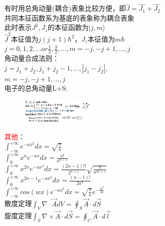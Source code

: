 \documentclass[a4paper,8pt]{extarticle} %
\newcommand{\redtext}[1]{\textcolor{red}{#1}}
\begin{document}
\begin{multicols}{3}
有时用总角动量(耦合)表象比较方便，即$\hat{J} = \hat{J_1}+\hat{J_2}$\\
共同本征函数系为基底的表象称为耦合表象\\
此时表示$J^2,J_z$的本征函数为$|j,m\rangle$\\
$\hat{J}^2$本征值为$j(j+1)\hbar^2$，$J_z$本征值为$m\hbar$\\
$j=0,1,2,\dots or \frac{1}{2},\frac{3}{2},\dots, m=-j,-j+1,\dots,j$\\
角动量合成法则：\\$j=j_1+j_2,j_1+j_2-1,\dots,|j_1-j_2|$,
\\$m=-j,-j+1,\dots,j$\\
电子的总角动量L+S:\\
\begin{figure}[H]
    \vspace{-0.5cm}
    \centering
    \includegraphics[width=0.32\textwidth]{images/12.png}
    \vspace{-0.6cm}
\end{figure}

\redtext{其他}：\\
$\int_{-\infty}^{+\infty}e^{-ax^2}dx = \sqrt{\frac{\pi}{a}}$\\
$\int_{0}^{+\infty}x^ne^{-ax}dx = \frac{n!}{a^{n+1}}$\\
$\int_{0}^{+\infty}x^{2n}e^{-ax^2}dx = \frac{(2n-1)!!}{2^{n+1}}\sqrt{\frac{\pi}{a^{2n+1}}}$\\
$\int_{0}^{+\infty}x^{2n-1}e^{-ax^2}dx = \frac{(n-1)!}{2a^{n}}$\\
$\int_{-\infty}^{+\infty}cos(wx)e^{-ax^2}dx = \sqrt{\frac{\pi}{a}}e^{-\frac{w^2}{4a}}$\\
散度定理$\int_V \nabla\cdot\vec{A}dV = \oint_S \vec{A}\cdot d\vec{S}$\\
旋度定理$\int_S \nabla\times\vec{A}\cdot d\vec{S} = \oint_C \vec{A}\cdot d\vec{l}$\\
\end{multicols}
\end{document}
